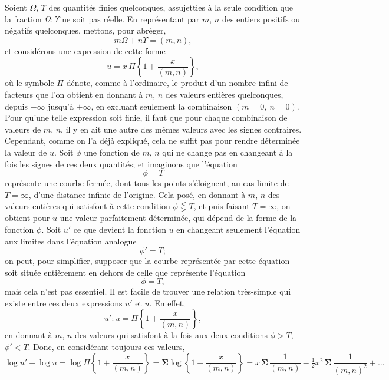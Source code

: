 \documentclass[11pt,a4paper]{book}
\begin{document}
Soient $\Omega$, $\Upsilon$ des quantit\'es finies quelconques, assujetties \`a la seule condition que
la fraction $\Omega : \Upsilon$ ne soit pas r\'eelle. En repr\'esentant par $m$, $n$ des entiers positifs
ou n\'egatifs quelconques, mettons, pour abr\'eger,
\begin{equation}
m\Omega + n\Upsilon = (m, n), \tag{1}
\end{equation}
et consid\'erons une expression de cette forme
\begin{equation}
u = x\, \Pi \left\{1 + \frac{x}{(m, n)}\right\}, \tag{2}
\end{equation}
o\`u le symbole $\Pi$ d\'enote, comme \`a l'ordinaire, le produit d'un nombre infini de facteurs
que l'on obtient en donnant \`a $m$, $n$ des valeurs enti\`eres quelconques, depuis $-\infty$ jusqu'\`a
$+\infty$, en excluant seulement la combinaison $(m = 0,\ n = 0)$. Pour qu'une telle expression
soit finie, il faut que pour chaque combinaison de valeurs de $m$, $n$, il y en ait une
autre des m\^emes valeurs avec les signes contraires. Cependant, comme on l'a d\'ej\`a
expliqu\'e, cela ne suffit pas pour rendre d\'etermin\'ee la valeur de $u$. Soit $\phi$ une
fonction de $m$, $n$ qui ne change pas en changeant \`a la fois les signes de ces deux
quantit\'es; et imaginons que l'\'equation
\[\phi = T\]
repr\'esente une courbe ferm\'ee, dont tous les points s'\'eloignent, au cas limite de
$T = \infty$, d'une distance infinie de l'origine. Cela pos\'e, en donnant \`a $m$, $n$ des valeurs
enti\`eres qui satisfont \`a cette condition $\phi \lesseqgtr T$, et puis faisant $T = \infty$, on obtient
pour $u$ une valeur parfaitement d\'etermin\'ee, qui d\'epend de la forme de la fonction $\phi$.
Soit $u'$ ce que devient la fonction $u$ en changeant seulement l'\'equation aux limites dans
l'\'equation analogue
\[\phi' = T;\]
on peut, pour simplifier, supposer que la courbe repr\'esent\'ee par cette \'equation soit
situ\'ee enti\`erement en dehors de celle que repr\'esente l'\'equation
\[\phi = T,\]
mais cela n'est pas essentiel. Il est facile de trouver une relation tr\`es-simple qui
existe entre ces deux expressions $u'$ et $u$. En effet,
\[u' : u = \Pi \left\{1 + \frac{x}{(m, n)}\right\},\]
en donnant \`a $m$, $n$ des valeurs qui satisfont \`a la fois aux deux conditions $\phi > T$,
$\phi' < T$. Donc, en consid\'erant toujours ces valeurs,
\[\log u' - \log u = \log \Pi \left\{1 + \frac{x}{(m, n)}\right\}
= \boldsymbol{\Sigma} \log \left\{1 + \frac{x}{(m, n)}\right\}
= x\, \boldsymbol{\Sigma}\, \frac{1}{(m, n)} - \tfrac{1}{2}x^2\, \boldsymbol{\Sigma}\, \frac{1}{(m, n)^2} + \ldots\]
\end{document}
